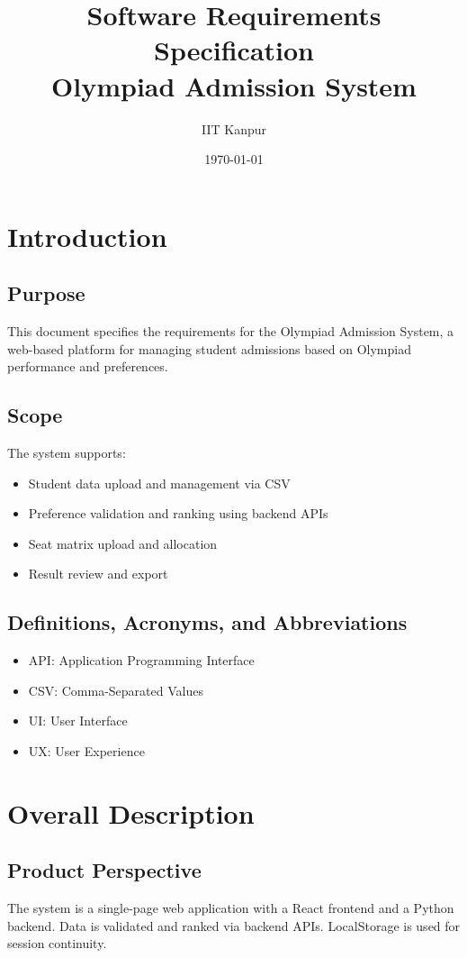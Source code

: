 \documentclass[12pt,a4paper]{article}
\title{Software Requirements Specification\\Olympiad Admission System}
\author{IIT Kanpur}
\date{\today}
\begin{document}
\maketitle

\tableofcontents
\newpage

\section{Introduction}
\subsection{Purpose}
This document specifies the requirements for the Olympiad Admission System, a web-based platform for managing student admissions based on Olympiad performance and preferences.

\subsection{Scope}
The system supports:
\begin{itemize}
    \item Student data upload and management via CSV
    \item Preference validation and ranking using backend APIs
    \item Seat matrix upload and allocation
    \item Result review and export
\end{itemize}

\subsection{Definitions, Acronyms, and Abbreviations}
\begin{itemize}
    \item API: Application Programming Interface
    \item CSV: Comma-Separated Values
    \item UI: User Interface
    \item UX: User Experience
\end{itemize}

\section{Overall Description}
\subsection{Product Perspective}
The system is a single-page web application with a React frontend and a Python backend. Data is validated and ranked via backend APIs. LocalStorage is used for session continuity.
\end{document}
